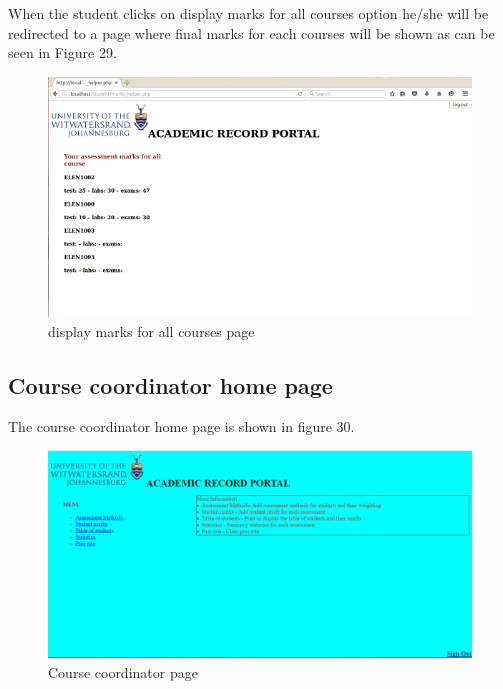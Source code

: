 \documentclass[10pt,onecolumn]{MainDocument}
\begin{document}
When the student clicks on display marks for all courses option he/she will be redirected to a page where final marks for each courses will be shown as can be seen in Figure 29. 

\newpage
\begin{center}
\begin{figure}[h]
\centering
\includegraphics[trim = {0 0cm 0cm 0cm},clip, scale=1]{StudentMarks}
\caption{display marks for all courses page}
\end{figure}
\end{center}

\newpage
\subsection{Course coordinator home page}

The course coordinator home page is shown in figure 30.

\begin{center}
\begin{figure}[h]
\centering
\includegraphics[trim = {0 0cm 0cm 0cm},clip, scale=0.5]{CourseCoordinatorPage}
\caption{Course coordinator page}
\end{figure}
\end{center}
\end{document}
